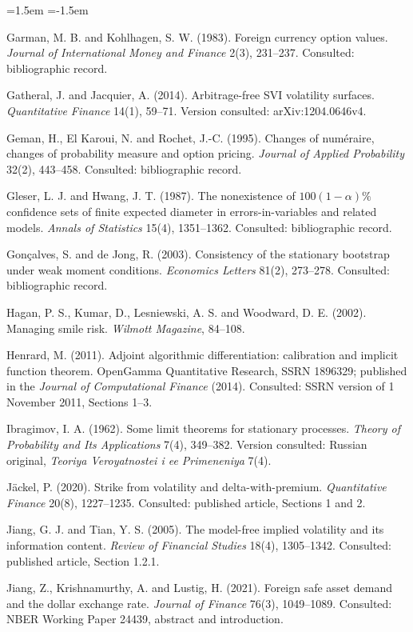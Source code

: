 \documentclass[11pt]{article}
\theoremstyle{result}
\begin{document}
\begin{list}{}{\leftmargin=1.5em \itemindent=-1.5em \itemsep=2pt \parsep=0pt}
\item Garman, M. B. and Kohlhagen, S. W. (1983). Foreign currency option values. \emph{Journal of International Money and Finance} 2(3), 231--237. Consulted: bibliographic record.
\item Gatheral, J. and Jacquier, A. (2014). Arbitrage-free SVI volatility surfaces. \emph{Quantitative Finance} 14(1), 59--71. Version consulted: arXiv:1204.0646v4.
\item Geman, H., El Karoui, N. and Rochet, J.-C. (1995). Changes of num\'eraire, changes of probability measure and option pricing. \emph{Journal of Applied Probability} 32(2), 443--458. Consulted: bibliographic record.
\item Gleser, L. J. and Hwang, J. T. (1987). The nonexistence of $100(1-\alpha)\%$ confidence sets of finite expected diameter in errors-in-variables and related models. \emph{Annals of Statistics} 15(4), 1351--1362. Consulted: bibliographic record.
\item Gon\c{c}alves, S. and de Jong, R. (2003). Consistency of the stationary bootstrap under weak moment conditions. \emph{Economics Letters} 81(2), 273--278. Consulted: bibliographic record.
\item Hagan, P. S., Kumar, D., Lesniewski, A. S. and Woodward, D. E. (2002). Managing smile risk. \emph{Wilmott Magazine}, 84--108.
\item Henrard, M. (2011). Adjoint algorithmic differentiation: calibration and implicit function theorem. OpenGamma Quantitative Research, SSRN 1896329; published in the \emph{Journal of Computational Finance} (2014). Consulted: SSRN version of 1 November 2011, Sections 1--3.
\item Ibragimov, I. A. (1962). Some limit theorems for stationary processes. \emph{Theory of Probability and Its Applications} 7(4), 349--382. Version consulted: Russian original, \emph{Teoriya Veroyatnostei i ee Primeneniya} 7(4).
\item J\"ackel, P. (2020). Strike from volatility and delta-with-premium. \emph{Quantitative Finance} 20(8), 1227--1235. Consulted: published article, Sections 1 and 2.
\item Jiang, G. J. and Tian, Y. S. (2005). The model-free implied volatility and its information content. \emph{Review of Financial Studies} 18(4), 1305--1342. Consulted: published article, Section 1.2.1.
\item Jiang, Z., Krishnamurthy, A. and Lustig, H. (2021). Foreign safe asset demand and the dollar exchange rate. \emph{Journal of Finance} 76(3), 1049--1089. Consulted: NBER Working Paper 24439, abstract and introduction.

\end{list}
\end{document}
